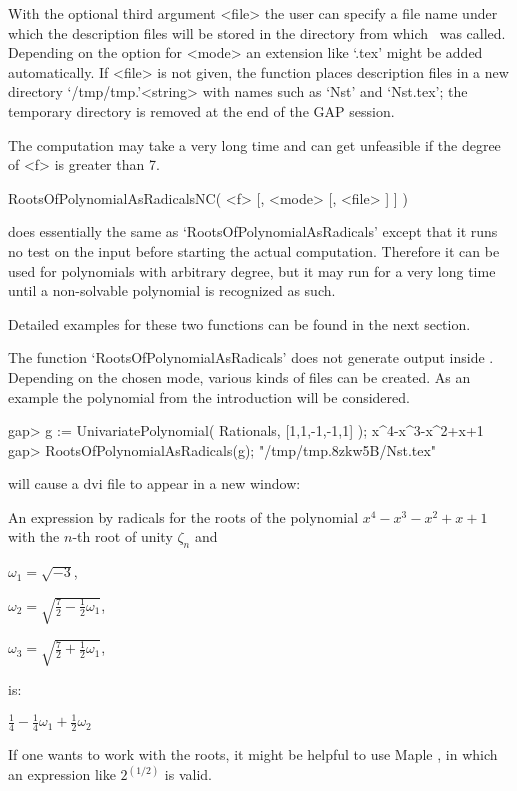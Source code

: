 With the optional third argument <file> the user can specify a
file name under which the description files will be stored in the 
directory from which \GAP\ was called. Depending on the option for
<mode> an extension like `.tex' might be added automatically. 
If <file> is not given, the function places description files in a new
directory `/tmp/tmp.'<string> with names such as `Nst' and `Nst.tex';
the temporary directory is removed at the end of the {\sf GAP}
session.

The computation may take a very long time and can get unfeasible if the
degree of <f> is greater than 7.
\beginexample
\endexample

\> RootsOfPolynomialAsRadicalsNC( <f> [, <mode> [, <file> ] ] )

does essentially the same as `RootsOfPolynomialAsRadicals' except
that it runs no test on the input before starting the actual
computation. Therefore it can be used for polynomials with arbitrary
degree, but it may run for a very long time until a
non-solvable polynomial is recognized as such.

Detailed examples for these two functions can be found in the next section.


The function `RootsOfPolynomialAsRadicals' does not generate output
inside \GAP. Depending on the chosen mode, various kinds
of files can be created. As an example the polynomial from the
introduction will be considered.

\beginexample
gap> g := UnivariatePolynomial( Rationals, [1,1,-1,-1,1] );
x^4-x^3-x^2+x+1
gap> RootsOfPolynomialAsRadicals(g);
"/tmp/tmp.8zkw5B/Nst.tex"
\endexample

will cause a dvi file to appear in a new window:

An expression by radicals for the roots of the polynomial
$x^{4}-x^{3}-x^{2} + x + 1$ with the $n$-th root of unity $\zeta_n$ and

$\omega_1 = \sqrt{ - 3}$,

$\omega_2 = \sqrt{\frac{7}{2} - \frac{1}{2}\omega_1}$,

$\omega_3 = \sqrt{\frac{7}{2} + \frac{1}{2}\omega_1}$,

is:

$\frac{1}{4} - \frac{1}{4}\omega_1 + \frac{1}{2}\omega_2$

If one wants to work with the roots, it might be helpful to use Maple
\cite{Maple10}, in which an expression like $2^{(1/2)}$ is valid.

